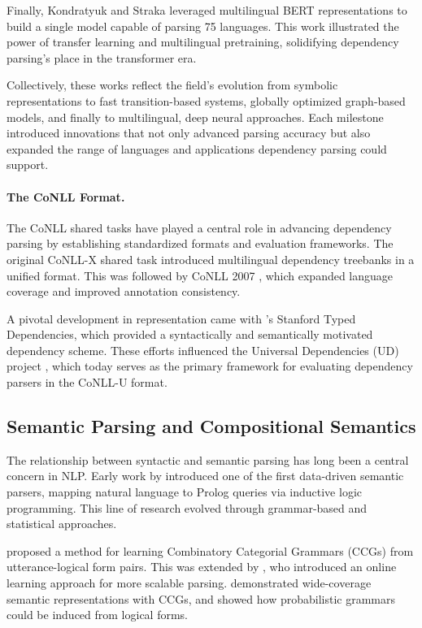 Finally, Kondratyuk and Straka \cite{kondratyuk2019udpipe} leveraged multilingual BERT representations to build a single model capable of parsing 75 languages. This work illustrated the power of transfer learning and multilingual pretraining, solidifying dependency parsing’s place in the transformer era.

Collectively, these works reflect the field’s evolution from symbolic representations to fast transition-based systems, globally optimized graph-based models, and finally to multilingual, deep neural approaches. Each milestone introduced innovations that not only advanced parsing accuracy but also expanded the range of languages and applications dependency parsing could support.

\paragraph{The CoNLL Format.} The CoNLL shared tasks have played a central role in advancing dependency parsing by establishing standardized formats and evaluation frameworks. The original CoNLL-X shared task \citep{buchholz2006conll} introduced multilingual dependency treebanks in a unified format. This was followed by CoNLL 2007 \citep{nivre2007conll}, which expanded language coverage and improved annotation consistency.

A pivotal development in representation came with \citet{de2006generating}'s Stanford Typed Dependencies, which provided a syntactically and semantically motivated dependency scheme. These efforts influenced the Universal Dependencies (UD) project \citep{nivre2016universal}, which today serves as the primary framework for evaluating dependency parsers in the CoNLL-U format.


\subsection{Semantic Parsing and Compositional Semantics}

The relationship between syntactic and semantic parsing has long been a central concern in NLP. Early work by \citet{zelle1996} introduced one of the first data-driven semantic parsers, mapping natural language to Prolog queries via inductive logic programming. This line of research evolved through grammar-based and statistical approaches.

\citet{zettlemoyer2005} proposed a method for learning Combinatory Categorial Grammars (CCGs) from utterance-logical form pairs. This was extended by \citet{zettlemoyer2007online}, who introduced an online learning approach for more scalable parsing. \citet{bos2004} demonstrated wide-coverage semantic representations with CCGs, and \citet{kwiatkowski2010} showed how probabilistic grammars could be induced from logical forms.

